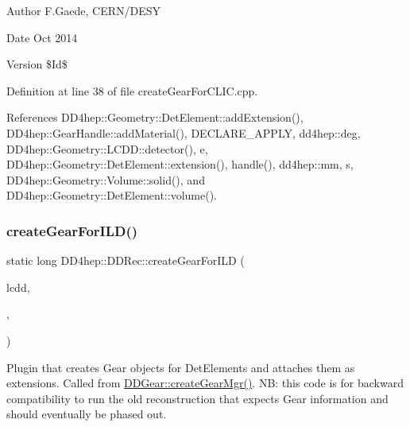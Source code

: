 \begin{DoxyAuthor}{Author}
F.\+Gaede, C\+E\+R\+N/\+D\+E\+SY 
\end{DoxyAuthor}
\begin{DoxyDate}{Date}
Oct 2014 
\end{DoxyDate}
\begin{DoxyVersion}{Version}
\$\+Id\$ 
\end{DoxyVersion}


Definition at line 38 of file create\+Gear\+For\+C\+L\+I\+C.\+cpp.



References D\+D4hep\+::\+Geometry\+::\+Det\+Element\+::add\+Extension(), D\+D4hep\+::\+Gear\+Handle\+::add\+Material(), D\+E\+C\+L\+A\+R\+E\+\_\+\+A\+P\+P\+LY, dd4hep\+::deg, D\+D4hep\+::\+Geometry\+::\+L\+C\+D\+D\+::detector(), e, D\+D4hep\+::\+Geometry\+::\+Det\+Element\+::extension(), handle(), dd4hep\+::mm, s, D\+D4hep\+::\+Geometry\+::\+Volume\+::solid(), and D\+D4hep\+::\+Geometry\+::\+Det\+Element\+::volume().

\hypertarget{namespace_d_d4hep_1_1_d_d_rec_aa9a44ffd1338e5e01378ca9ce61656cc}{}\label{namespace_d_d4hep_1_1_d_d_rec_aa9a44ffd1338e5e01378ca9ce61656cc} 
\subsubsection{\texorpdfstring{create\+Gear\+For\+I\+L\+D()}{createGearForILD()}}
{\footnotesize\ttfamily static long D\+D4hep\+::\+D\+D\+Rec\+::create\+Gear\+For\+I\+LD (\begin{DoxyParamCaption}\item[{\hyperlink{class_d_d4hep_1_1_geometry_1_1_l_c_d_d}{L\+C\+DD} \&}]{lcdd,  }\item[{int}]{,  }\item[{char $\ast$$\ast$}]{ }\end{DoxyParamCaption})\hspace{0.3cm}{\ttfamily [static]}}

Plugin that creates Gear objects for Det\+Elements and attaches them as extensions. Called from \hyperlink{namespace_d_d4hep_aeaa49904e5fff3d47fa8fd9600655f3e}{D\+D\+Gear\+::create\+Gear\+Mgr()}. NB\+: this code is for backward compatibility to run the old reconstruction that expects Gear information and should eventually be phased out.


